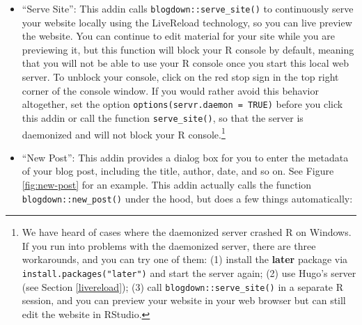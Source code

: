 \documentclass[12pt,]{krantz}
\theoremstyle{definition}
\theoremstyle{definition}
\theoremstyle{definition}
\theoremstyle{remark}
\begin{document}
\begin{itemize}
\item
  ``Serve Site'': This addin calls \texttt{blogdown::serve\_site()} to
  continuously serve your website locally using the LiveReload
  technology, so you can live preview the website. You can continue to
  edit material for your site while you are previewing it, but this
  function will block your R console by default, meaning that you will
  not be able to use your R console once you start this local web
  server. To unblock your console, click on the red stop sign in the top
  right corner of the console window. If you would rather avoid this
  behavior altogether, set the option
  \texttt{options(servr.daemon\ =\ TRUE)} before you click this addin or
  call the function \texttt{serve\_site()}, so that the server is
  daemonized and will not block your R console.\footnote{We have heard
    of cases where the daemonized server crashed R on Windows. If you
    run into problems with the daemonized server, there are three
    workarounds, and you can try one of them: (1) install the
    \textbf{later} package via \texttt{install.packages("later")} and
    start the server again; (2) use Hugo's server (see Section
    \ref{livereload}); (3) call \texttt{blogdown::serve\_site()} in a
    separate R session, and you can preview your website in your web
    browser but can still edit the website in RStudio.}
\item
  ``New Post'': This addin provides a dialog box for you to enter the
  metadata of your blog post, including the title, author, date, and so
  on. See Figure \ref{fig:new-post} for an example. This addin actually
  calls the function \texttt{blogdown::new\_post()} under the hood, but
  does a few things automatically:


\end{itemize}
\end{document}

